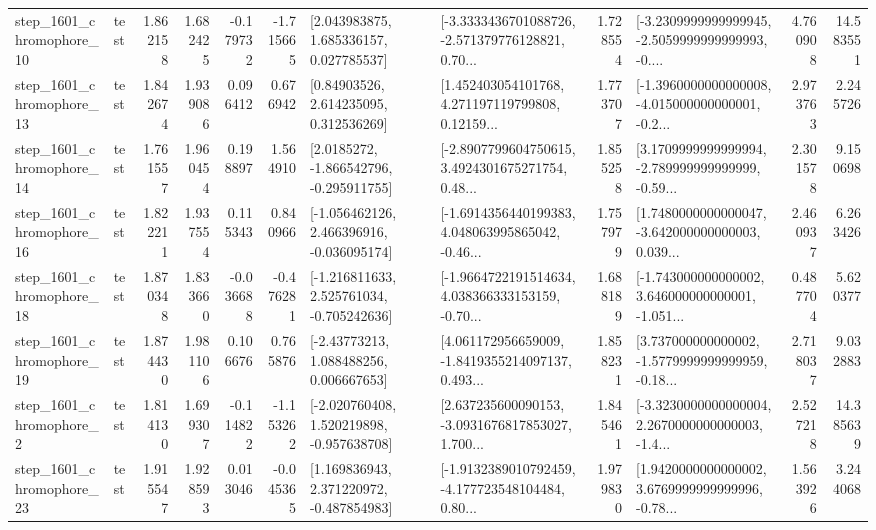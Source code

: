\begin{tabular}{llrrrrllrlrr}
 step\_1601\_chromophore\_10 &      test &      1.862158 &    1.682425 &     -0.179732 & -1.715665 &     [2.043983875, 1.685336157, 0.027785537] &  [-3.3333436701088726, -2.571379776128821, 0.70... &       1.728554 &  [-3.2309999999999945, -2.5059999999999993, -0.... &            4.760908 &         14.583551 \\
 step\_1601\_chromophore\_13 &      test &      1.842674 &    1.939086 &      0.096412 &  0.676942 &      [0.84903526, 2.614235095, 0.312536269] &  [1.452403054101768, 4.271197119799808, 0.12159... &       1.773707 &  [-1.3960000000000008, -4.015000000000001, -0.2... &            2.973763 &          2.245726 \\
 step\_1601\_chromophore\_14 &      test &      1.761557 &    1.960454 &      0.198897 &  1.564910 &     [2.0185272, -1.866542796, -0.295911755] &  [-2.8907799604750615, 3.4924301675271754, 0.48... &       1.855258 &  [3.1709999999999994, -2.789999999999999, -0.59... &            2.301578 &          9.150698 \\
 step\_1601\_chromophore\_16 &      test &      1.822211 &    1.937554 &      0.115343 &  0.840966 &   [-1.056462126, 2.466396916, -0.036095174] &  [-1.6914356440199383, 4.048063995865042, -0.46... &       1.757979 &  [1.7480000000000047, -3.642000000000003, 0.039... &            2.460937 &          6.263426 \\
 step\_1601\_chromophore\_18 &      test &      1.870348 &    1.833660 &     -0.036688 & -0.476281 &   [-1.216811633, 2.525761034, -0.705242636] &  [-1.9664722191514634, 4.038366333153159, -0.70... &       1.688189 &  [-1.743000000000002, 3.646000000000001, -1.051... &            0.487704 &          5.620377 \\
 step\_1601\_chromophore\_19 &      test &      1.874430 &    1.981106 &      0.106676 &  0.765876 &     [-2.43773213, 1.088488256, 0.006667653] &  [4.061172956659009, -1.8419355214097137, 0.493... &       1.858231 &  [3.737000000000002, -1.5779999999999959, -0.18... &            2.718037 &          9.032883 \\
  step\_1601\_chromophore\_2 &      test &      1.814130 &    1.699307 &     -0.114822 & -1.153262 &   [-2.020760408, 1.520219898, -0.957638708] &  [2.637235600090153, -3.0931676817853027, 1.700... &       1.845461 &  [-3.3230000000000004, 2.2670000000000003, -1.4... &            2.527218 &         14.385639 \\
 step\_1601\_chromophore\_23 &      test &      1.915547 &    1.928593 &      0.013046 & -0.045365 &    [1.169836943, 2.371220972, -0.487854983] &  [-1.9132389010792459, -4.177723548104484, 0.80... &       1.979830 &  [1.9420000000000002, 3.6769999999999996, -0.78... &            1.563926 &          3.244068 \\

\end{tabular}
